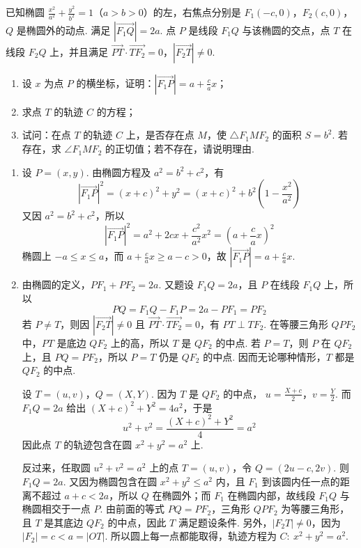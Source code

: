 \begin{problem}
已知椭圆 \(\frac{x^2}{a^2} + \frac{y^2}{b^2} = 1\)（\(a > b > 0\)）的左，右焦点分别是 \(F_1(-c, 0)\)，\(F_2(c, 0)\)，\(Q\) 是椭圆外的动点. 满足 \(\left|\overrightarrow{F_1Q}\right| = 2a\). 点 \(P\) 是线段 \(F_1Q\) 与该椭圆的交点，点 \(T\) 在线段 \(F_2Q\) 上，并且满足 \(\overrightarrow{PT} \cdot \overrightarrow{TF_2} = 0\)，\(\left|\overrightarrow{F_2T}\right| \neq 0\).

\begin{enumerate}
\item 设 \(x\) 为点 \(P\) 的横坐标，证明：\(\left|\overrightarrow{F_1P}\right| = a + \frac{c}{a}x\)；
\item 求点 \(T\) 的轨迹 \(C\) 的方程；
\item 试问：在点 \(T\) 的轨迹 \(C\) 上，是否存在点 \(M\)，使 \(\triangle F_1MF_2\) 的面积 \(S = b^2\). 若存在，求 \(\angle F_1MF_2\) 的正切值；若不存在，请说明理由.
\end{enumerate}

\begin{solution}
\begin{enumerate}
\item 设 \(P=(x,y)\). 由椭圆方程及 \(a^2=b^2+c^2\)，有
\[
\left|\overrightarrow{F_1P}\right|^2=(x+c)^2+y^2=(x+c)^2+b^2\left(1-\frac{x^2}{a^2}\right)
\]
又因 \(a^2=b^2+c^2\)，所以
\[
\left|\overrightarrow{F_1P}\right|^2=a^2+2cx+\frac{c^2}{a^2}x^2=\left(a+\frac ca x\right)^2
\]
椭圆上 \(-a\leqslant x\leqslant a\)，而 \(a+\frac ca x\geqslant a-c>0\)，故
\(\left|\overrightarrow{F_1P}\right|=a+\frac ca x\).

\item 由椭圆的定义，\(PF_1+PF_2=2a\). 又题设 \(F_1Q=2a\)，且 \(P\) 在线段 \(F_1Q\) 上，所以
\[
PQ=F_1Q-F_1P=2a-PF_1=PF_2
\]
若 \(P\ne T\)，则因 \(\left|\overrightarrow{F_2T}\right|\ne0\) 且 \(\overrightarrow{PT}\cdot\overrightarrow{TF_2}=0\)，有 \(PT\perp TF_2\). 在等腰三角形 \(QPF_2\) 中，\(PT\) 是底边 \(QF_2\) 上的高，所以 \(T\) 是 \(QF_2\) 的中点. 若 \(P=T\)，则 \(P\) 在 \(QF_2\) 上，且 \(PQ=PF_2\)，所以 \(P=T\) 仍是 \(QF_2\) 的中点. 因而无论哪种情形，\(T\) 都是 \(QF_2\) 的中点.

设 \(T=(u,v)\)，\(Q=(X,Y)\). 因为 \(T\) 是 \(QF_2\) 的中点，
\(u=\frac{X+c}{2}\)，\(v=\frac Y2\).
而 \(F_1Q=2a\) 给出 \((X+c)^2+Y^2=4a^2\)，于是
\[
u^2+v^2=\frac{(X+c)^2+Y^2}{4}=a^2
\]
因此点 \(T\) 的轨迹包含在圆 \(x^2+y^2=a^2\) 上.

反过来，任取圆 \(u^2+v^2=a^2\) 上的点 \(T=(u,v)\)，令 \(Q=(2u-c,2v)\). 则 \(F_1Q=2a\). 又因为椭圆包含在圆 \(x^2+y^2\leqslant a^2\) 内，且 \(F_1\) 到该圆内任一点的距离不超过 \(a+c<2a\)，所以 \(Q\) 在椭圆外；而 \(F_1\) 在椭圆内部，故线段 \(F_1Q\) 与椭圆相交于一点 \(P\). 由前面的等式 \(PQ=PF_2\)，三角形 \(QPF_2\) 为等腰三角形，且 \(T\) 是其底边 \(QF_2\) 的中点，因此 \(T\) 满足题设条件. 另外，\(|F_2T|\ne0\)，因为 \(|F_2|=c<a=|OT|\). 所以圆上每一点都能取得，轨迹方程为
\(C:\ x^2+y^2=a^2\).


\end{enumerate}
\end{solution}
\end{problem}
